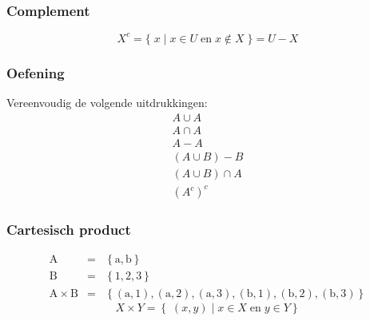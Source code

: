 \documentclass[dutch]{../khlslides}
\newcommand{\element}[3][]{
  \draw[fill=black] (#2) circle (.05);
  \node[anchor=south west,#1] at (#2) {#3};
}
\newcommand{\union}{\cup}
\newcommand{\intersect}{\cap}
\begin{document}
\begin{frame}
  \frametitle{Complement}
  \begin{center}
  \end{center}
  \[
    X^c = \{ \; x \;|\; x \in U \;\mathrm{en}\; x \notin X \; \} = U - X
  \]
\end{frame}

\begin{frame}
  \frametitle{Oefening}
  Vereenvoudig de volgende uitdrukkingen:
  \[
    \begin{array}{c}
      A \union A \\[2mm]
      A \intersect A \\[2mm]
      A - A \\[2mm]
      (A \union B) - B \\[2mm]
      (A \union B) \intersect A \\[2mm]
      (A^c)^c
    \end{array}
  \]
\end{frame}

\begin{frame}
  \frametitle{Cartesisch product}
  \begin{center}
  \end{center}
  \[
    \begin{array}{rcl}
      \mathrm{A} & = & \left\{ \mathrm{a}, \mathrm{b} \right\} \\
      \mathrm{B} & = & \left\{ 1, 2, 3 \right\} \\
      \mathrm{A} \times \mathrm{B} & = & \left\{ ( \mathrm{a}, 1 ), (\mathrm{a}, 2 ), (\mathrm{a}, 3 ), ( \mathrm{b}, 1 ), (\mathrm{b}, 2 ), (\mathrm{b}, 3 ) \right\}
    \end{array}
  \]
  \vskip2mm
  \[
    X \times Y = \left\{ \; (x, y) \;|\; x \in X \;\mathrm{en}\; y \in Y \right\}
  \]
\end{frame}
\end{document}
